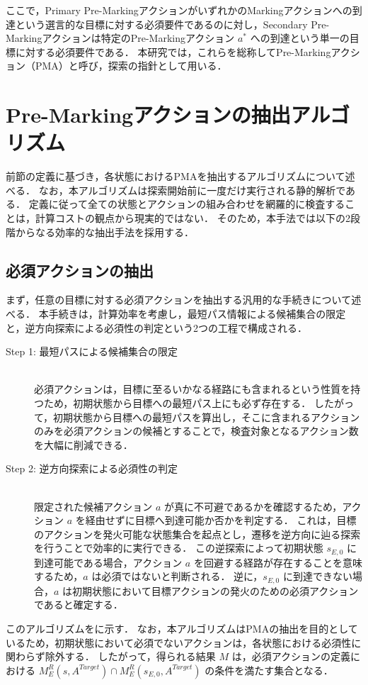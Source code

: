 \documentclass[a4paper,11pt,oneside,openany,report,dvipdfmx]{jsbook}
\newcommand{\descitem}[1]{\item[#1]\mbox{}\\}
\newcommand\aref[1]{\hyperref[#1]{\prettyref{#1}}}
\begin{document}
ここで，Primary Pre-MarkingアクションがいずれかのMarkingアクションへの到達という選言的な目標に対する必須要件であるのに対し，Secondary Pre-Markingアクションは特定のPre-Markingアクション $a^*$ への到達という単一の目標に対する必須要件である．
本研究では，これらを総称してPre-Markingアクション（PMA）と呼び，探索の指針として用いる．

\section{Pre-Markingアクションの抽出アルゴリズム}

前節の定義に基づき，各状態におけるPMAを抽出するアルゴリズムについて述べる．
なお，本アルゴリズムは探索開始前に一度だけ実行される静的解析である．
定義に従って全ての状態とアクションの組み合わせを網羅的に検査することは，計算コストの観点から現実的ではない．
そのため，本手法では以下の2段階からなる効率的な抽出手法を採用する．

\subsection{必須アクションの抽出}

まず，任意の目標に対する必須アクションを抽出する汎用的な手続きについて述べる．
本手続きは，計算効率を考慮し，最短パス情報による候補集合の限定と，逆方向探索による必須性の判定という2つの工程で構成される．

\begin{description}
  \descitem{Step 1: 最短パスによる候補集合の限定}
  必須アクションは，目標に至るいかなる経路にも含まれるという性質を持つため，初期状態から目標への最短パス上にも必ず存在する．
  したがって，初期状態から目標への最短パスを算出し，そこに含まれるアクションのみを必須アクションの候補とすることで，検査対象となるアクション数を大幅に削減できる．

  \descitem{Step 2: 逆方向探索による必須性の判定}
  限定された候補アクション $a$ が真に不可避であるかを確認するため，アクション $a$ を経由せずに目標へ到達可能か否かを判定する．
  これは，目標のアクションを発火可能な状態集合を起点とし，遷移を逆方向に辿る探索を行うことで効率的に実行できる．
  この逆探索によって初期状態 $s_{E,0}$ に到達可能である場合，アクション $a$ を回避する経路が存在することを意味するため，$a$ は必須ではないと判断される．
  逆に，$s_{E,0}$ に到達できない場合，$a$ は初期状態において目標アクションの発火のための必須アクションであると確定する．
\end{description}

このアルゴリズムを\aref{alg:extract_required}に示す．
なお，本アルゴリズムはPMAの抽出を目的としているため，初期状態において必須でないアクションは，各状態における必須性に関わらず除外する．
したがって，得られる結果 $M$ は，必須アクションの定義における $M^R_E(s, A^\mathit{Target}) \cap M^R_E(s_{E,0}, A^\mathit{Target})$ の条件を満たす集合となる．
\end{document}
